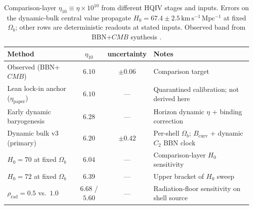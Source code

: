 \documentclass[11pt]{amsart}
\begin{document}
\begin{table}[ht]
\centering
\small
\caption{Comparison-layer $\eta_{10}\equiv \eta\times 10^{10}$ from
different HQIV stages and inputs. Errors on the dynamic-bulk central
value propagate $H_0=67.4\pm 2.5\,\mathrm{km\,s^{-1}\,Mpc^{-1}}$ at
fixed $\Omega_b$; other rows are deterministic readouts at stated
inputs. Observed band from BBN+$CMB$ synthesis \cite{coc2015}.}
\label{tab:eta-methods}
\begin{tabularx}{\linewidth}{@{}lccX@{}}
\toprule
Method & $\eta_{10}$ & uncertainty & Notes \\
\midrule
Observed (BBN+$CMB$) & $6.10$ & $\pm 0.06$ & Comparison target \cite{coc2015} \\
Lean lock-in anchor ($\eta_{\mathrm{paper}}$) & $6.10$ & --- & Quarantined calibration; not derived here \\
Early dynamic baryogenesis & $6.28$ & --- & Horizon dynamic $\eta$ + binding correction \\
Dynamic bulk v3 (primary) & $6.20$ & $\pm 0.42$ & Per-shell $\Omega_b$; $B_{\mathrm{curv}}$ + dynamic $C_2$ BBN clock \\
\quad $H_0=70$ at fixed $\Omega_b$ & $6.04$ & --- & Comparison-layer $H_0$ sensitivity \\
\quad $H_0=72$ at fixed $\Omega_b$ & $6.39$ & --- & Upper bracket of $H_0$ sweep \\
\quad $\rho_{\mathrm{rad}}=0.5$ vs.\ $1.0$ & $6.68$ / $5.60$ & --- & Radiation-floor sensitivity on shell source \\
\bottomrule
\end{tabularx}
\end{table}
\end{document}
